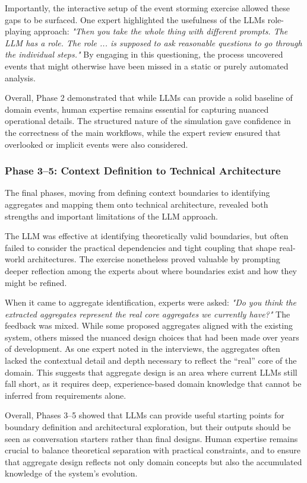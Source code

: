 Importantly, the interactive setup of the event storming exercise allowed these gaps to be surfaced. One expert highlighted the usefulness of the LLMs role-playing approach: \textit{"Then you take the whole thing with different prompts. The LLM has a role. The role ... is supposed to ask reasonable questions to go through the individual steps."} By engaging in this questioning, the process uncovered events that might otherwise have been missed in a static or purely automated analysis.  

Overall, Phase 2 demonstrated that while LLMs can provide a solid baseline of domain events, human expertise remains essential for capturing nuanced operational details. The structured nature of the simulation gave confidence in the correctness of the main workflows, while the expert review ensured that overlooked or implicit events were also considered. 

\subsubsection{Phase 3--5: Context Definition to Technical Architecture}
The final phases, moving from defining context boundaries to identifying aggregates and mapping them onto technical architecture, revealed both strengths and important limitations of the LLM approach.  

The LLM was effective at identifying theoretically valid boundaries, but often failed to consider the practical dependencies and tight coupling that shape real-world architectures. The exercise nonetheless proved valuable by prompting deeper reflection among the experts about where boundaries exist and how they might be refined.  

When it came to aggregate identification, experts were asked: \textit{"Do you think the extracted aggregates represent the real core aggregates we currently have?"} The feedback was mixed. While some proposed aggregates aligned with the existing system, others missed the nuanced design choices that had been made over years of development. As one expert noted in the interviews, the aggregates often lacked the contextual detail and depth necessary to reflect the “real” core of the domain. This suggests that aggregate design is an area where current LLMs still fall short, as it requires deep, experience-based domain knowledge that cannot be inferred from requirements alone.  

Overall, Phases 3--5 showed that LLMs can provide useful starting points for boundary definition and architectural exploration, but their outputs should be seen as conversation starters rather than final designs. Human expertise remains crucial to balance theoretical separation with practical constraints, and to ensure that aggregate design reflects not only domain concepts but also the accumulated knowledge of the system's evolution.

